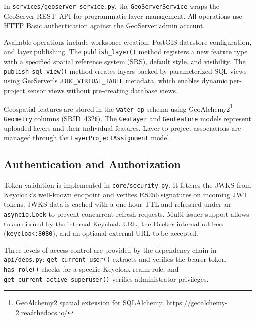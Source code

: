 In \texttt{services/geoserver\_service.py}, the \texttt{GeoServerService} wraps the GeoServer
REST~API for programmatic layer management. All operations use HTTP Basic authentication
against the GeoServer admin account.

Available operations include workspace creation, PostGIS datastore configuration, and
layer publishing. The \texttt{publish\_layer()} method registers a new feature type with a
specified spatial reference system (SRS), default style, and visibility. The
\texttt{publish\_sql\_view()} method creates layers backed by parameterized SQL views using
GeoServer's \texttt{JDBC\_VIRTUAL\_TABLE} metadata, which enables dynamic per-project
sensor views without pre-creating database views.

Geospatial features are stored in the \texttt{water\_dp} schema using GeoAlchemy2\footnote{GeoAlchemy2 spatial extension for SQLAlchemy: \url{https://geoalchemy-2.readthedocs.io/}}
\texttt{Geometry} columns (SRID~4326). The \texttt{GeoLayer} and \texttt{GeoFeature} models
represent uploaded layers and their individual features. Layer-to-project associations
are managed through the \texttt{LayerProjectAssignment} model.

\subsection{Authentication and Authorization}
\label{sec:impl-backend-auth}

Token validation is implemented in \texttt{core/security.py}. It fetches the JWKS
from Keycloak's well-known endpoint and verifies RS256 signatures on incoming JWT tokens.
JWKS data is cached with a one-hour TTL and refreshed under an \texttt{asyncio.Lock} to
prevent concurrent refresh requests. Multi-issuer support allows tokens issued by the
internal Keycloak URL, the Docker-internal address (\texttt{keycloak:8080}), and an optional
external URL to be accepted.

Three levels of access control are provided by the dependency chain in \texttt{api/deps.py}: \texttt{get\_current\_user()} extracts and verifies the bearer token,
\texttt{has\_role()} checks for a specific Keycloak realm role, and
\texttt{get\_current\_active\_superuser()} verifies administrator privileges.

